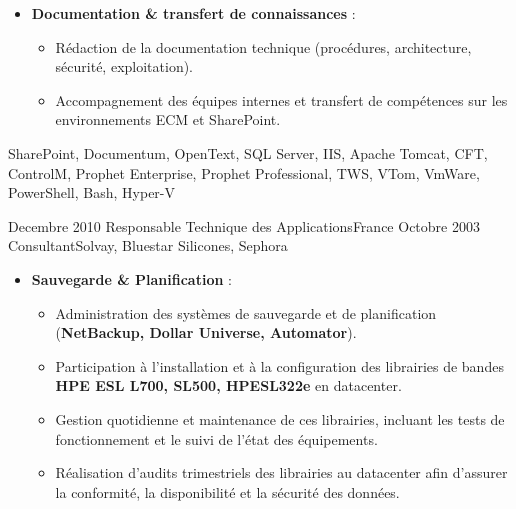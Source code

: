 \begin{experiences}
{\begin{itemize}[left=0pt,label={},itemsep=0.4em]
\begin{itemize}[itemsep=0.15em,topsep=0.1em,parsep=0pt]
              \item Coordination d’équipes offshore (Pologne, Maroc, Inde) pour le maintien en condition opérationnelle.
            \end{itemize}
          \vspace{0.1em}
          \item \textbf{Documentation \& transfert de connaissances} :
            \begin{itemize}[itemsep=0.15em,topsep=0.1em,parsep=0pt]
              \small
              \item Rédaction de la documentation technique (procédures, architecture, sécurité, exploitation).
              \item Accompagnement des équipes internes et transfert de compétences sur les environnements ECM et SharePoint.
            \end{itemize}
        \end{itemize}
        \vspace{0.3em}
    }
    {SharePoint, Documentum, OpenText, SQL Server, IIS, Apache Tomcat, CFT, ControlM, Prophet Enterprise, Prophet Professional, TWS, VTom, VmWare, PowerShell, Bash, Hyper-V}
\emptySeparator


\consultantexperience
    {Decembre 2010} {Responsable Technique des Applications}{}{France}
    {Octobre 2003}    {Consultant}{Solvay, Bluestar Silicones, Sephora} {
        \begin{itemize}[left=0pt,label={},itemsep=0.5em]
        \vspace{0.3em}  %
          \item \textbf{Sauvegarde \& Planification} :
            \begin{itemize}[itemsep=0.2em,topsep=0.2em,parsep=0pt]
              \small
              \item Administration des systèmes de sauvegarde et de planification (\textbf{NetBackup, Dollar Universe, Automator}).
              \item Participation à l'installation et à la configuration des librairies de bandes \textbf{HPE ESL L700, SL500, HPESL322e} en datacenter.
              \item Gestion quotidienne et maintenance de ces librairies, incluant les tests de fonctionnement et le suivi de l'état des équipements.
              \item Réalisation d'audits trimestriels des librairies au datacenter afin d'assurer la conformité, la disponibilité et la sécurité des données.
            \end{itemize}


\end{itemize}}
\end{experiences}
